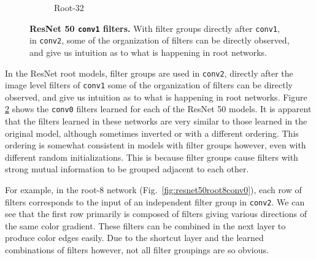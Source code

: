 \documentclass[thesis]{subfiles}
\begin{document}
\begin{figure}[tb]
\begin{subfigure}[b]{0.45\linewidth}
			\caption{Root-32}
			\label{fig:resnet50root32conv0}
		\end{subfigure}
		\caption{\textbf{ResNet 50 \texttt{conv1} filters.} With filter groups directly after \texttt{conv1}, in \texttt{conv2}, some of the organization of filters can be directly observed, and give us intuition as to what is happening in root networks.}
		\label{fig:resnet50conv0}
	\end{figure}
	In the ResNet root models, filter groups are used in \texttt{conv2},  directly after the image level filters of \texttt{conv1} some of the organization of filters can be directly observed, and give us intuition as to what is happening in root networks. Figure \ref{fig:resnet50conv0} shows the \texttt{conv0} filters learned for each of the ResNet 50 models. It is apparent that the filters learned in these networks are very similar to those learned in the original model, although sometimes inverted or with a different ordering. This ordering is somewhat consistent in models with filter groups however, even with different random initializations. This is because filter groups cause filters with strong mutual information to be grouped adjacent to each other.
	
	For example, in the root-8 network (Fig.~\ref{fig:resnet50root8conv0}), each row of filters corresponds to the input of an independent filter group in \texttt{conv2}. We can see that the first row primarily is composed of filters giving various directions of the same color gradient. These filters can be combined in the next layer to produce color edges easily. Due to the shortcut layer and the learned combinations of filters however, not all filter groupings are so obvious.
	
\end{document}
